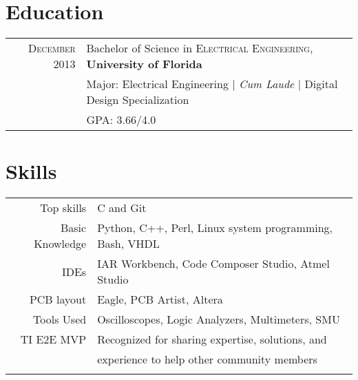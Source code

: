 \documentclass[a4paper,10pt]{article} %
\begin{document}

\section{Education}

\begin{tabular}{rl}
\textsc{December} 2013 & Bachelor of Science in \textsc{Electrical Engineering}, \textbf{University of Florida}\\
& \small{Major: Electrical Engineering  | \emph{Cum Laude}  |  Digital Design Specialization}\\
&\normalsize \textsc{GPA}: 3.66/4.0\\


\end{tabular}


\section{Skills}

\begin{tabular}{rl}
Top skills & C and Git\\
Basic Knowledge & Python, C++, Perl, Linux system programming, Bash, VHDL\\
IDEs & IAR Workbench, Code Composer Studio, Atmel Studio\\
PCB layout & Eagle, PCB Artist, Altera\\
Tools Used &  Oscilloscopes, Logic Analyzers, Multimeters, SMU\\
TI E2E MVP & Recognized for sharing expertise, solutions, and \\ &  \hspace{5mm} experience to help other community members\\
\\
\end{tabular}
\end{document}
